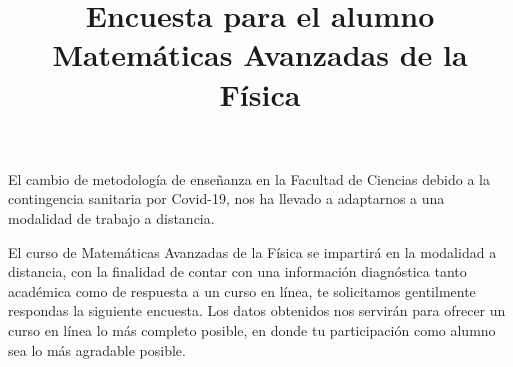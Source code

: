 
\usepackage{geometry}
\geometry{top=1.25cm, bottom=1.5cm, left=1.25cm, right=1.25cm}
\usepackage{enumerate}
\usepackage{pifont}
\renewcommand{\labelitemi}{\ding{43}}
\title{{Encuesta para el alumno} \\ {\large Matemáticas Avanzadas de la Física} \vspace{-1.5\baselineskip}}
\date{ }
\let\olditemize\itemize
\def\itemize{\olditemize\itemsep=0pt}

\renewcommand\labelenumii{\theenumi.{\arabic{enumii}}}
\maketitle
\fontsize{14}{14}\selectfont
El cambio de metodología de enseñanza en la Facultad de Ciencias debido a la contingencia sanitaria por Covid-19, nos ha llevado a adaptarnos a una modalidad de trabajo a distancia.
\par
El curso de Matemáticas Avanzadas de la Física se impartirá en la modalidad a distancia, con la finalidad de contar con una información diagnóstica tanto académica como de respuesta a un curso en línea, te solicitamos gentilmente respondas la siguiente encuesta. Los datos obtenidos nos servirán para ofrecer un curso en línea lo más completo posible, en donde tu participación como alumno sea lo más agradable posible.
